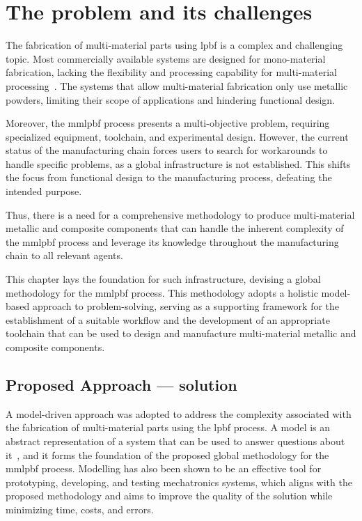 %
%
\chapter{The problem and its challenges}%
\label{ch:prob-challenge}
The fabrication of multi-material parts using \gls{lpbf} is a complex and challenging topic. Most commercially available systems are designed for mono-material fabrication, lacking the flexibility and processing capability for multi-material processing~\cite{mussatto2022research}. The systems that allow multi-material fabrication only use metallic powders, limiting their scope of applications and hindering functional design.

Moreover, the \gls{mmlpbf} process presents a multi-objective problem, requiring specialized equipment, toolchain, and experimental design. However, the current status of the manufacturing chain forces users to search for workarounds to handle specific problems, as a global infrastructure is not established. This shifts the focus from functional design to the manufacturing process, defeating the intended purpose.

Thus, there is a need for a comprehensive methodology to produce multi-material metallic and composite components that can handle the inherent complexity of the \gls{mmlpbf} process and leverage its knowledge throughout the manufacturing chain to all relevant agents.

This chapter lays the foundation for such infrastructure, devising a global methodology for the \gls{mmlpbf} process. This methodology adopts a holistic model-based approach to problem-solving, serving as a supporting framework for the establishment of a suitable workflow and the development of an appropriate toolchain that can be used to design and manufacture multi-material metallic and composite components.

\section{Proposed Approach --- solution}
A model-driven approach was adopted to address the complexity associated
with the fabrication of multi-material parts using the \gls{lpbf} process. A
model is an abstract representation of a system that can be used to answer
questions about it~\cite{bruegge2004object}, and it forms the foundation of the
proposed global methodology for the \gls{mmlpbf} process. Modelling has also been shown to be an effective tool for prototyping, developing, and testing mechatronics systems, which aligns with the proposed methodology and aims to improve the quality of the solution while minimizing time, costs, and errors.

